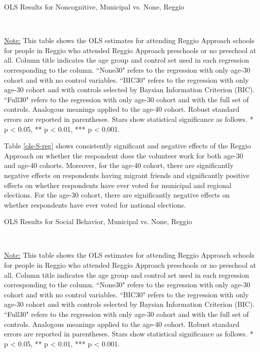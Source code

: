 \begin{table}[H] \caption{OLS Results for Noncognitive, Municipal vs. None, Reggio} \label{ols-N-reg}

\vspace{1ex} \\
\footnotesize\raggedright{\underline{Note:} This table shows the OLS estimates for attending Reggio Approach schools for people in Reggio who attended Reggio Approach preschools or no preschool at all. Column title indicates the age group and control set used in each regression corresponding to the column. ``None30" refers to the regression with only age-30 cohort and with no control variables. ``BIC30" refers to the regression with only age-30 cohort and with controls selected by Baysian Information Criterion (BIC). ``Full30" refers to the regression with only age-30 cohort and with the full set of controls. Analogous meanings applied to the age-40 cohort. Robust standard errors are reported in parentheses. Stars show statistical significance as follows. * p < 0.05, ** p < 0.01, *** p < 0.001.}
\end{table}

Table \ref{ols-S-reg} shows consistently significant and negative effects of the Reggio Approach on whether the respondent does the volunteer work for both age-30 and age-40 cohorts. Moreover, for the age-40 cohort, there are significantly negative effects on respondents having migrant friends and significantly positive effects on whether respondents have ever voted for municipal and regional elections. For the age-30 cohort, there are significantly negative effects on whether respondents have ever voted for national elections.

\begin{table}[H] \caption{OLS Results for Social Behavior, Municipal vs. None, Reggio} \label{ols-S-reg}

\vspace{1ex} \\
\footnotesize\raggedright{\underline{Note:} This table shows the OLS estimates for attending Reggio Approach schools for people in Reggio who attended Reggio Approach preschools or no preschool at all. Column title indicates the age group and control set used in each regression corresponding to the column. ``None30" refers to the regression with only age-30 cohort and with no control variables. ``BIC30" refers to the regression with only age-30 cohort and with controls selected by Baysian Information Criterion (BIC). ``Full30" refers to the regression with only age-30 cohort and with the full set of controls. Analogous meanings applied to the age-40 cohort. Robust standard errors are reported in parentheses. Stars show statistical significance as follows. * p < 0.05, ** p < 0.01, *** p < 0.001.}
\end{table}


